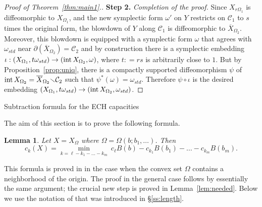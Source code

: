 \documentclass[11pt, reqno]{amsart}
\makeatletter
\def\subsection{\@startsection{subsection}{2}%
  \z@{.75\linespacing\@plus.7\linespacing}{-.5em}%
  {\normalfont\large\bfseries}}
\newtheorem{lemma}[thm]{Lemma}
\theoremstyle{remark}
\numberwithin{equation}{subsection}
\numberwithin{figure}{section}
\theoremstyle{customremark}
\newcommand{\intt}{{\rm int}}
\newcommand{\NI}{{\noindent}}
\newcommand{\Cc}{{\mathcal C}}
\newcommand{\ov}{\overline}
\newcommand{\Om}{{\Omega}}
\newcommand{\om}{{\omega}}
\newcommand{\io}{{\iota}}
\newcommand{\less} {{\smallsetminus}}
\newcommand{\p}{{\partial}}
\newcommand{\MS}{{\medskip}}
\makeatother
\begin{document}
\begin{proof}[Proof of Theorem~\ref{thm:main1}.]
\MS
 
 
 \NI
 {\bf Step 2.} {\it  Completion of the proof.}
  Since $X_{r\Om_1}$ is diffeomorphic to $X_{\Om_1}$, and  the new symplectic form $\om'$ on  $Y$  restricts on $\Cc_1$ to
  $s$ times the original form,  
  the blowdown of $Y$ along $\Cc_1$ is diffeomorphic to $\ov X_{\Om_2}$.
Moreover, this blowdown is equipped with a symplectic form $\om$ that agrees with $\om_{std}$  near $\p(\ov X_{\Om_2}) = \Cc_2$ 
and by construction there is a symplectic embedding $\io:(X_{\Om_1}, t \om_{std})\to (\intt\,  X_{\Om_2},\om)$, where $t: = rs$ is arbitrarily close to $1$. 
But by Proposition~\ref{prop:uniq}, there is a compactly supported diffeomorphism $\psi$ of  $\intt\,  X_{\Om_2} =  
 \ov X_{\Om_2}\less \Cc_2$ such that $\psi^*(\om) = \om_{std}$.   Therefore $\psi\circ \io$ is the desired embedding
 $(X_{\Om_1},t \om_{std})\to (\intt\,  X_{\Om_2},\om_{std})$.
 \end{proof}
 
 \subsection{Subtraction formula for the ECH capacities}\label{ss:subtract}
 
The aim of this section is to prove the following formula.

\begin{lemma}\label{lem:ECHk} Let $X = X_\Om$ where $\Om =\Om(b;b_1,\ldots)$.
Then
\begin{equation}
\label{eqn:echsub}
c_k(X) = \min_{k = \ell - k_1 - \ldots - k_m}\ c_\ell B(b) - c_{k_1} B(b_1) - \ldots - c_{k_m} B(b_m).
\end{equation}
\end{lemma}

This formula is proved in  \cite[Thm.A.1]{CG}  in the case when the convex set $\Om$ contains a neighborhood of the origin. 
The proof in the general case follows by essentially the same argument; the crucial new step is proved in  Lemma~\ref{lem:needed}.
 Below we use the notation  of \cite{CG} that was introduced in \S\ref{ss:length}.
\end{document}
